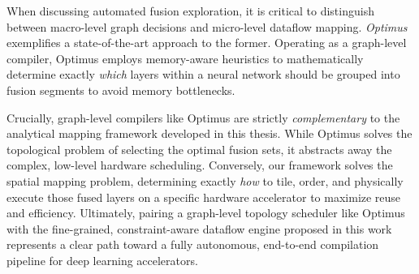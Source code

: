 When discussing automated fusion exploration, it is critical to distinguish between macro-level graph decisions and micro-level dataflow mapping. \emph{Optimus}~\cite{10.1145/3461648.3463848} exemplifies a state-of-the-art approach to the former. Operating as a graph-level compiler, Optimus employs memory-aware heuristics to mathematically determine exactly \emph{which} layers within a neural network should be grouped into fusion segments to avoid memory bottlenecks. 

Crucially, graph-level compilers like Optimus are strictly \emph{complementary} to the analytical mapping framework developed in this thesis. While Optimus solves the topological problem of selecting the optimal fusion sets, it abstracts away the complex, low-level hardware scheduling. Conversely, our framework solves the spatial mapping problem, determining exactly \emph{how} to tile, order, and physically execute those fused layers on a specific hardware accelerator to maximize reuse and efficiency. Ultimately, pairing a graph-level topology scheduler like Optimus with the fine-grained, constraint-aware dataflow engine proposed in this work represents a clear path toward a fully autonomous, end-to-end compilation pipeline for deep learning accelerators.
